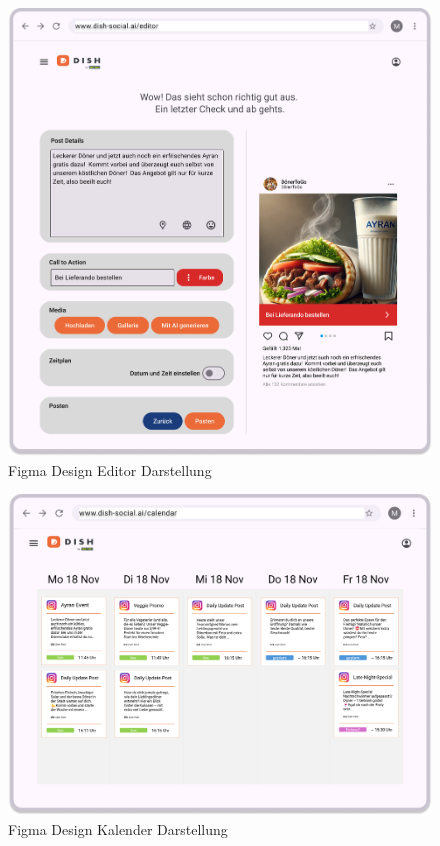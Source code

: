 \begin{figure}[htbp]
    \centering
    \includegraphics[width=\textwidth]{abbildungen/figma/Editor}
    \caption[]{Figma Design Editor Darstellung}
    \label{fig:editor-page}
\end{figure}
\newpage

\begin{figure}[htbp]
    \centering
    \includegraphics[width=\textwidth]{abbildungen/figma/Kalender}
    \caption[]{Figma Design Kalender Darstellung}
    \label{fig:calendar-page}
\end{figure}

